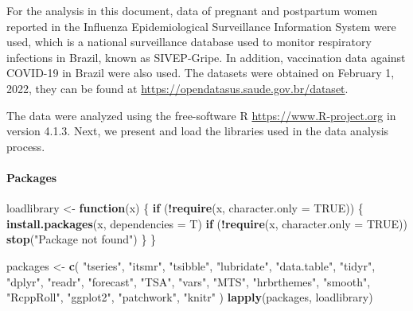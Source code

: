 \documentclass[
]{article}
\newenvironment{Shaded}{\begin{snugshade}}{\end{snugshade}}
\newcommand{\AttributeTok}[1]{\textcolor[rgb]{0.13,0.29,0.53}{#1}}
\newcommand{\ConstantTok}[1]{\textcolor[rgb]{0.56,0.35,0.01}{#1}}
\newcommand{\ControlFlowTok}[1]{\textcolor[rgb]{0.13,0.29,0.53}{\textbf{#1}}}
\newcommand{\FunctionTok}[1]{\textcolor[rgb]{0.13,0.29,0.53}{\textbf{#1}}}
\newcommand{\NormalTok}[1]{#1}
\newcommand{\OtherTok}[1]{\textcolor[rgb]{0.56,0.35,0.01}{#1}}
\newcommand{\SpecialCharTok}[1]{\textcolor[rgb]{0.81,0.36,0.00}{\textbf{#1}}}
\newcommand{\StringTok}[1]{\textcolor[rgb]{0.31,0.60,0.02}{#1}}
\renewenvironment{Shaded}{\begin{mdframed}[ backgroundcolor=shadecolor, linecolor = shadecolor, leftmargin=\dimexpr\leftmargin-2pt\relax, innerleftmargin=1.6pt, innertopmargin=5pt, skipabove=10pt,skipbelow=3pt ]}{\end{mdframed}}
\begin{document}
For the analysis in this document, data of pregnant and postpartum women
reported in the Influenza Epidemiological Surveillance Information
System were used, which is a national surveillance database used to
monitor respiratory infections in Brazil, known as SIVEP-Gripe. In
addition, vaccination data against COVID-19 in Brazil were also used.
The datasets were obtained on February 1, 2022, they can be found at
\url{https://opendatasus.saude.gov.br/dataset}.

The data were analyzed using the free-software R
\url{https://www.R-project.org} in version 4.1.3. Next, we present and
load the libraries used in the data analysis process.

\paragraph{Packages}\label{packages}

\begin{Shaded}
\begin{Highlighting}[]
\NormalTok{loadlibrary }\OtherTok{\textless{}{-}} \ControlFlowTok{function}\NormalTok{(x) \{}
  \ControlFlowTok{if}\NormalTok{ (}\SpecialCharTok{!}\FunctionTok{require}\NormalTok{(x, }\AttributeTok{character.only =} \ConstantTok{TRUE}\NormalTok{)) \{}
    \FunctionTok{install.packages}\NormalTok{(x, }\AttributeTok{dependencies =}\NormalTok{ T)}
    \ControlFlowTok{if}\NormalTok{ (}\SpecialCharTok{!}\FunctionTok{require}\NormalTok{(x, }\AttributeTok{character.only =} \ConstantTok{TRUE}\NormalTok{))}
      \FunctionTok{stop}\NormalTok{(}\StringTok{"Package not found"}\NormalTok{)}
\NormalTok{  \}}
\NormalTok{\}}

\NormalTok{packages }\OtherTok{\textless{}{-}}
  \FunctionTok{c}\NormalTok{(}
    \StringTok{"tseries"}\NormalTok{,}
    \StringTok{"itsmr"}\NormalTok{,}
    \StringTok{"tsibble"}\NormalTok{,}
    \StringTok{"lubridate"}\NormalTok{,}
    \StringTok{"data.table"}\NormalTok{,}
    \StringTok{"tidyr"}\NormalTok{,}
    \StringTok{"dplyr"}\NormalTok{,}
    \StringTok{"readr"}\NormalTok{,}
    \StringTok{"forecast"}\NormalTok{,}
    \StringTok{"TSA"}\NormalTok{,}
    \StringTok{"vars"}\NormalTok{,}
    \StringTok{"MTS"}\NormalTok{,}
    \StringTok{"hrbrthemes"}\NormalTok{,}
    \StringTok{"smooth"}\NormalTok{,}
    \StringTok{"RcppRoll"}\NormalTok{,}
    \StringTok{"ggplot2"}\NormalTok{,}
    \StringTok{"patchwork"}\NormalTok{,}
    \StringTok{"knitr"}
\NormalTok{  )}
\FunctionTok{lapply}\NormalTok{(packages, loadlibrary)}
\end{Highlighting}
\end{Shaded}
\end{document}
